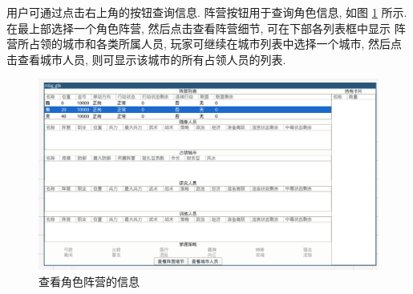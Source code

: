 \documentclass[UTF8, zihao=-4]{ctexart} %
\begin{document}
用户可通过点击右上角的按钮查询信息. 
阵营按钮用于查询角色信息, 如图 \ref{f_role} 所示. 
在最上部选择一个角色阵营, 然后点击查看阵营细节, 可在下部各列表框中显示
阵营所占领的城市和各类所属人员, 玩家可继续在城市列表中选择一个城市,
然后点击查看城市人员, 则可显示该城市的所有占领人员的列表.
\begin{figure}
    \centering
    \includegraphics[width=\textwidth]{f_role.png}
    \caption{\label{f_role}查看角色阵营的信息}
\end{figure}
\end{document}
